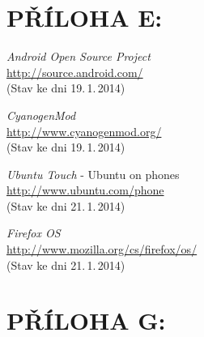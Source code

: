 \documentclass[12pt, a4paper, oneside]{article}
\newcommand{\It}{\textit}  %
\begin{document}
 \section*{PŘÍLOHA E:}
 \begin{thebibliography}{99}

     \It{Android Open Source Project} \\
    \url{http://source.android.com/}\\
    (Stav ke dni 19.\,1.\,2014)

     \It{CyanogenMod} \\
    \url{http://www.cyanogenmod.org/}\\
    (Stav ke dni 19.\,1.\,2014)

     \It{Ubuntu Touch} - Ubuntu on phones \\
    \url{http://www.ubuntu.com/phone}\\
    (Stav ke dni 21.\,1.\,2014)

     \It{Firefox OS}\\
    \url{http://www.mozilla.org/cs/firefox/os/}\\
    (Stav ke dni 21.\,1.\,2014)


\end{thebibliography}

\newpage
\section*{PŘÍLOHA G:}
~
\listoffigures   %
\end{document}
